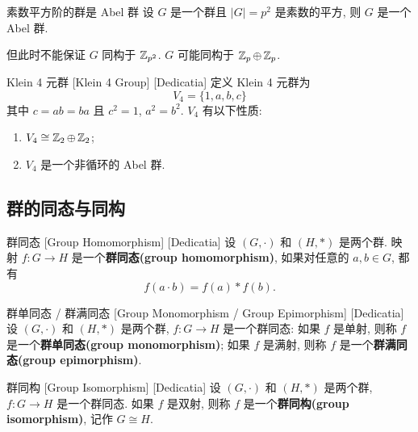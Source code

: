         \begin{crl}
            {素数平方阶的群是 Abel 群}
            设 \(G\) 是一个群且 \(|G|=p^2\) 是素数的平方, 则 \(G\) 是一个 Abel 群.
        \end{crl}

        \begin{rmk}
            但此时不能保证 \(G\) 同构于 \(\operatorname{\mathbb{Z}}_{p^2}\). \(G\) 可能同构于 \(\operatorname{\mathbb{Z}}_p\oplus\operatorname{\mathbb{Z}}_p\).
        \end{rmk}

        \begin{ins}
            {Klein 4 元群}
            [Klein 4 Group]
            [Dedicatia]
            定义 Klein 4 元群为
            \[V_4=\{1,a,b,c\}\]
            其中 \(c=ab=ba\) 且 \(c^2=1\), \(a^2=b^2\). \(V_4\) 有以下性质:
            \begin{enumerate}[label=(\roman*)]
                \item \(V_4\cong\operatorname{\mathbb{Z}}_2\oplus\operatorname{\mathbb{Z}}_2\);
                \item \(V_4\) 是一个非循环的 Abel 群.
            \end{enumerate}
        \end{ins}

    \subsection{群的同态与同构}

        \begin{dfn}
            [GroupHomomorphism]
            {群同态}
            [Group Homomorphism]
            [Dedicatia]
            设 \((G,\cdot)\) 和 \((H,\ast)\) 是两个群. 映射 \(f:G\to H\) 是一个\textbf{群同态(group homomorphism)}, 如果对任意的 \(a,b\in G\), 都有
            \[f(a\cdot b)=f(a)\ast f(b).\]
        \end{dfn}

        \begin{dfn}
            {群单同态 / 群满同态}
            [Group Monomorphism / Group Epimorphism]
            [Dedicatia]
            设 \((G,\cdot)\) 和 \((H,\ast)\) 是两个群, \(f:G\to H\) 是一个群同态: 如果 \(f\) 是单射, 则称 \(f\) 是一个\textbf{群单同态(group monomorphism)}; 如果 \(f\) 是满射, 则称 \(f\) 是一个\textbf{群满同态(group epimorphism)}.
        \end{dfn}

        \begin{dfn}
            [GroupIsomorphism]
            {群同构}
            [Group Isomorphism]
            [Dedicatia]
            设 \((G,\cdot)\) 和 \((H,\ast)\) 是两个群, \(f:G\to H\) 是一个群同态. 如果 \(f\) 是双射, 则称 \(f\) 是一个\textbf{群同构(group isomorphism)}, 记作 \(G\cong H\).
        \end{dfn}

